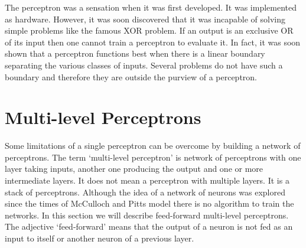 \documentclass[11pt]{article}
\numberwithin{equation}{section}
\begin{document}
The perceptron was a sensation when it was first developed. It was 
implemented as hardware. However, it was soon discovered that it was
incapable of solving simple problems like the famous XOR problem. If
an output is an exclusive OR of its input then one cannot train a 
perceptron to evaluate it. In fact, it was soon shown that a perceptron 
functions best when there is a linear boundary separating the various
classes of inputs. Several problems do not have such a boundary and
therefore they are outside the purview of a perceptron.

\section{Multi-level Perceptrons}\label{s3}
Some limitations of a single perceptron can be overcome by building a
network of perceptrons. The term `multi-level perceptron' is network of
perceptrons with one layer taking inputs, another one producing the output
and one or more intermediate layers. It does not mean a perceptron with
multiple layers. It is a stack of perceptrons. Although the idea of a 
network of neurons was explored since the times of McCulloch and Pitts model
there is no algorithm to train the networks. In this section we will 
describe feed-forward multi-level perceptrons. The adjective `feed-forward'
means that the output of a neuron is not fed as an input to itself or
another neuron of a previous layer.
\end{document}
